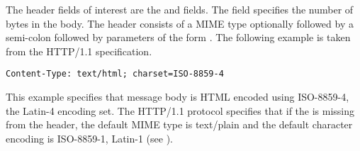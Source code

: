 The header fields of interest are the  and  fields.
The  field specifies the number of bytes in the body.
The  header consists of a MIME type optionally followed by 
a semi-colon followed by parameters of the form .
The following example is taken from the HTTP/1.1 specification.
\begin{verbatim}
Content-Type: text/html; charset=ISO-8859-4
\end{verbatim}
This example specifies that message body is HTML encoded using
ISO-8859-4, the Latin-4 encoding set.
The HTTP/1.1 protocol specifies that if the  is missing from the header,
the default MIME type is text/plain and the default
character encoding is ISO-8859-1, Latin-1 (see ).

